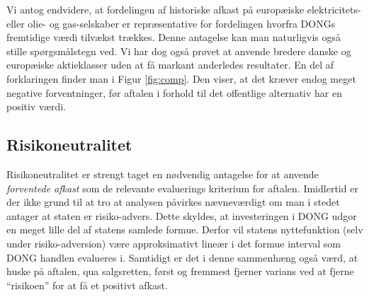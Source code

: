 \documentclass{article}
\begin{document}
\begin{appendices}
Vi antog endvidere, at fordelingen af historiske afkast på europæiske elektricitets- eller olie- og gas-selskaber er repræsentative for fordelingen hvorfra DONGs fremtidige værdi tilvækst trækkes. Denne antagelse kan man naturligvis også stille spørgsmålstegn ved. Vi har dog også prøvet at anvende bredere danske og europæiske aktieklasser uden at få markant anderledes resultater. En del af forklaringen finder man i Figur \ref{fig:comp}. Den viser, at det kræver endog meget negative forventninger, før aftalen i forhold til det offentlige alternativ har en positiv værdi.


\subsection{Risikoneutralitet}

Risikoneutralitet er strengt taget en nødvendig antagelse for at anvende \emph{forventede afkast} som de relevante evaluerings kriterium for aftalen. Imidlertid er der ikke grund til at tro at analysen påvirkes nævneværdigt om man i stedet antager at staten er risiko-advers. Dette skyldes, at investeringen i DONG udgor en meget lille del af statens samlede formue. Derfor vil statens nyttefunktion (selv under risiko-adversion) være approksimativt lineær i det formue interval som DONG handlen evalueres i. Samtidigt er det i denne sammenhæng også værd, at huske på aftalen, qua salgsretten, først og fremmest fjerner varians ved at fjerne \enquote{risikoen} for at få et positivt afkast. 




\end{appendices}
\end{document}
